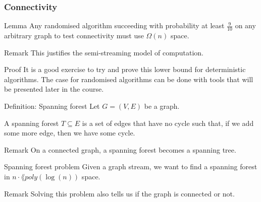 \documentclass[a4paper]{article}
\begin{document}
\subsubsection{Connectivity}

\begin{parag}{Lemma}
    Any randomised algorithm succeeding with probability at least $\frac{9}{10}$ on any arbitrary graph to test connectivity must use $\Omega\left(n\right)$ space.

    \begin{subparag}{Remark}
        This justifies the semi-streaming model of computation.
    \end{subparag}

    \begin{subparag}{Proof}
        It is a good exercise to try and prove this lower bound for deterministic algorithms. The case for randomised algorithms can be done with tools that will be presented later in the course.
    \end{subparag}
\end{parag}

\begin{parag}{Definition: Spanning forest}
    Let $G = \left(V, E\right)$ be a graph. 

    A spanning forest $T \subseteq E$ is a set of edges that have no cycle such that, if we add some more edge, then we have some cycle.

    \begin{subparag}{Remark}
        On a connected graph, a spanning forest becomes a spanning tree.
    \end{subparag}
\end{parag}

\begin{parag}{Spanning forest problem}
    Given a graph stream, we want to find a spanning forest in $n\cdot\lang{poly}\left(\log\left(n\right)\right)$ space.

    \begin{subparag}{Remark}
        Solving this problem also tells us if the graph is connected or not.
    \end{subparag}
\end{parag}
\end{document}
